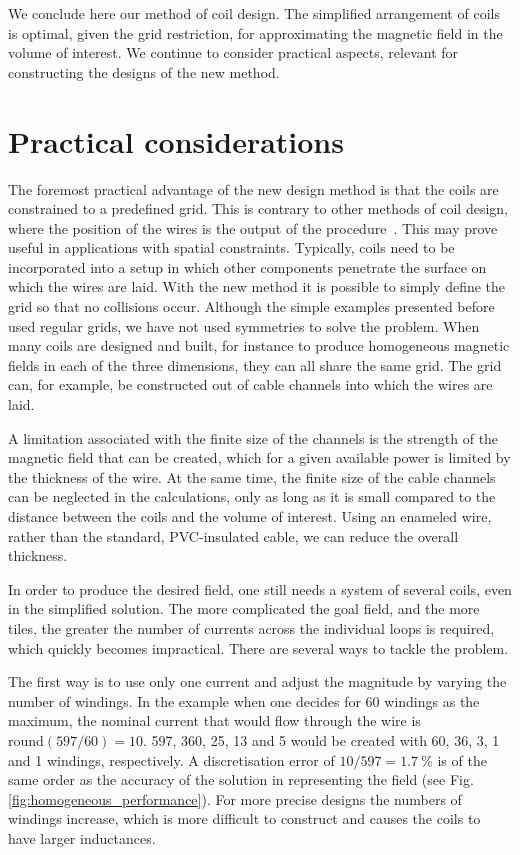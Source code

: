 We conclude here our method of coil design.
The simplified arrangement of coils is optimal, given the grid restriction, for approximating the magnetic field in the volume of interest.
We continue to consider practical aspects, relevant for constructing the designs of the new method.




\section{Practical considerations}
The foremost practical advantage of the new design method is that the coils are constrained to a predefined grid.
This is contrary to other methods of coil design, where the position of the wires is the output of the procedure~\cite{Turner1993, Beidler1990}. This may prove useful in applications with spatial constraints.
Typically, coils need to be incorporated into a setup in which other components penetrate the surface on which the wires are laid.
With the new method it is possible to simply define the grid so that no collisions occur.
Although the simple examples presented before used regular grids, we have not used symmetries to solve the problem.
When many coils are designed and built, for instance to produce homogeneous magnetic fields in each of the three dimensions, they can all share the same grid.
The grid can, for example, be constructed out of cable channels into which the wires are laid.

A limitation associated with the finite size of the channels is the strength of the magnetic field that can be created, which for a given available power is limited by the thickness of the wire.
At the same time, the finite size of the cable channels can be neglected in the calculations, only as long as it is small compared to the distance between the coils and the volume of interest.
Using an enameled wire, rather than the standard, PVC-insulated cable, we can reduce the overall thickness.

In order to produce the desired field, one still needs a system of several coils, even in the simplified solution.
The more complicated the goal field, and the more tiles, the greater the number of currents across the individual loops is required, which quickly becomes impractical.
There are several ways to tackle the problem.

The first way is to use only one current and adjust the magnitude by varying the number of windings.
In the example when one decides for \num{60} windings as the maximum, the nominal current that would flow through the wire is $\mathrm{round}(597 / 60) = 10$.
 \num{597}, \num{360}, \num{25}, \num{13} and \num{5} would be created with \num{60}, \num{36}, \num{3}, \num{1} and \num{1} windings, respectively.
A discretisation error of $10 / 597 = \SI{1.7}{\percent}$ is of the same order as the accuracy of the solution in representing the field (see Fig.\,\ref{fig:homogeneous_performance}).
For more precise designs the numbers of windings increase, which is more difficult to construct and causes the coils to have larger inductances.

